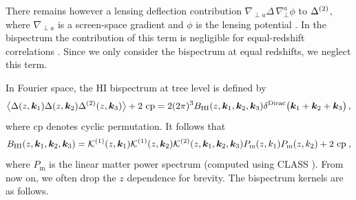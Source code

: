 {\begin{itemize}
There remains however a lensing deflection contribution $\nabla_{\perp a}\Delta\,\nabla_\perp^a\phi$ to  $\Delta^{{(2)}}$,  where $\nabla_{\perp a}$ is a screen-space gradient and $\phi$ is the lensing potential \cite{Umeh:2015gza,DiDio:2015bua,Jalivand:2018vfz}. In the bispectrum the contribution of this term is negligible for equal-redshift correlations \cite{DiDio:2015bua,Durrer:2020orn}. Since we only consider the bispectrum at equal redshifts, we neglect this term. 
\end{itemize}}

In Fourier space, the  HI bispectrum  at  tree level  is defined by
\begin{equation}
\big\langle \Delta(z,\bm{k}_{1})\Delta(z,\bm{k}_{2})\Delta^{(2)}(z,\bm{k}_{3}) \big\rangle + \text{2 cp}=2 (2\pi)^3 B_{{\mathrm{HI}}}(z, \bm{k}_{1}, \bm{k}_{2}, \bm{k}_{3}) \delta^{\mathrm{Dirac}}\big(\bm{k}_{1}+ \bm{k}_{2}+ \bm{k}_{3} \big)\,, \label{e1.3}
\end{equation}
where cp denotes cyclic permutation. It follows that
\begin{equation}
B_{{\mathrm{HI}}}(z, \bm{k}_{1}, \bm{k}_{2}, \bm{k}_{3}) = \mathcal{K}^{(1)}(z, \bm{k}_{1})\mathcal{K}^{(1)}(z, \bm{k}_{2})\mathcal{K}^{(2)}(z, \bm{k}_{1}, \bm{k}_{2}, \bm{k}_{3})P_{\mathrm{m}} (z, k_{1})P_{\mathrm{m}} (z, k_{2}) + \text{2 cp}\;, \label{e1.5}
\end{equation} 
where $P_{\mathrm{m}} $ is the linear matter power spectrum (computed using CLASS \cite{Blas:2011rf}).  From now on, we often drop the $z$ dependence for brevity.  
%
The  bispectrum kernels are as follows.
